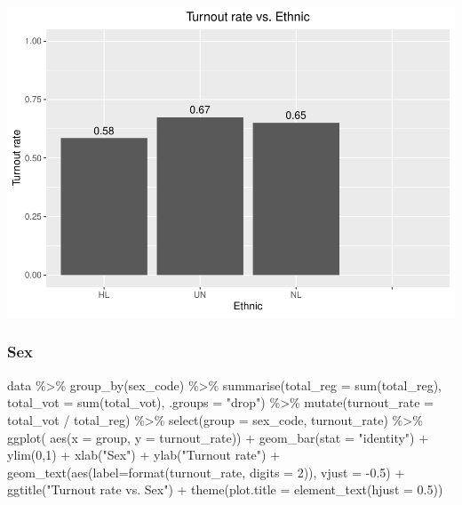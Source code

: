 \documentclass[
]{article}
\newenvironment{Shaded}{\begin{snugshade}}{\end{snugshade}}
\newcommand{\AttributeTok}[1]{\textcolor[rgb]{0.77,0.63,0.00}{#1}}
\newcommand{\DecValTok}[1]{\textcolor[rgb]{0.00,0.00,0.81}{#1}}
\newcommand{\FloatTok}[1]{\textcolor[rgb]{0.00,0.00,0.81}{#1}}
\newcommand{\FunctionTok}[1]{\textcolor[rgb]{0.00,0.00,0.00}{#1}}
\newcommand{\NormalTok}[1]{#1}
\newcommand{\SpecialCharTok}[1]{\textcolor[rgb]{0.00,0.00,0.00}{#1}}
\newcommand{\StringTok}[1]{\textcolor[rgb]{0.31,0.60,0.02}{#1}}
\begin{document}
\includegraphics{CS2_files/figure-latex/unnamed-chunk-11-1.pdf}

\hypertarget{sex}{%
\subsubsection{Sex}\label{sex}}

\begin{Shaded}
\begin{Highlighting}[]
\NormalTok{data }\SpecialCharTok{\%\textgreater{}\%}
  \FunctionTok{group\_by}\NormalTok{(sex\_code) }\SpecialCharTok{\%\textgreater{}\%}
  \FunctionTok{summarise}\NormalTok{(}\AttributeTok{total\_reg =} \FunctionTok{sum}\NormalTok{(total\_reg),}
            \AttributeTok{total\_vot =} \FunctionTok{sum}\NormalTok{(total\_vot), }\AttributeTok{.groups =} \StringTok{"drop"}\NormalTok{) }\SpecialCharTok{\%\textgreater{}\%}
  \FunctionTok{mutate}\NormalTok{(}\AttributeTok{turnout\_rate =}\NormalTok{ total\_vot }\SpecialCharTok{/}\NormalTok{ total\_reg) }\SpecialCharTok{\%\textgreater{}\%}
  \FunctionTok{select}\NormalTok{(}\AttributeTok{group =}\NormalTok{ sex\_code, turnout\_rate) }\SpecialCharTok{\%\textgreater{}\%}
  \FunctionTok{ggplot}\NormalTok{( }\FunctionTok{aes}\NormalTok{(}\AttributeTok{x =}\NormalTok{ group, }\AttributeTok{y =}\NormalTok{ turnout\_rate)) }\SpecialCharTok{+}
  \FunctionTok{geom\_bar}\NormalTok{(}\AttributeTok{stat =} \StringTok{"identity"}\NormalTok{) }\SpecialCharTok{+}
  \FunctionTok{ylim}\NormalTok{(}\DecValTok{0}\NormalTok{,}\DecValTok{1}\NormalTok{) }\SpecialCharTok{+}
  \FunctionTok{xlab}\NormalTok{(}\StringTok{"Sex"}\NormalTok{) }\SpecialCharTok{+} \FunctionTok{ylab}\NormalTok{(}\StringTok{"Turnout rate"}\NormalTok{) }\SpecialCharTok{+}
  \FunctionTok{geom\_text}\NormalTok{(}\FunctionTok{aes}\NormalTok{(}\AttributeTok{label=}\FunctionTok{format}\NormalTok{(turnout\_rate, }\AttributeTok{digits =} \DecValTok{2}\NormalTok{)), }\AttributeTok{vjust =} \SpecialCharTok{{-}}\FloatTok{0.5}\NormalTok{) }\SpecialCharTok{+}
  \FunctionTok{ggtitle}\NormalTok{(}\StringTok{"Turnout rate vs. Sex"}\NormalTok{) }\SpecialCharTok{+}
    \FunctionTok{theme}\NormalTok{(}\AttributeTok{plot.title =} \FunctionTok{element\_text}\NormalTok{(}\AttributeTok{hjust =} \FloatTok{0.5}\NormalTok{))}
\end{Highlighting}
\end{Shaded}
\end{document}
